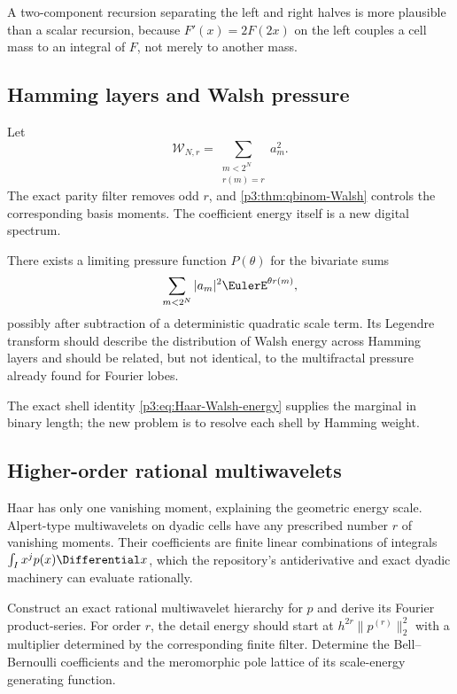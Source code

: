 \documentclass[11pt]{article}
\theoremstyle{definition}
\theoremstyle{remark}
\begin{document}
A two-component recursion separating the left and right halves is more
plausible than a scalar recursion, because $F'(x)=2F(2x)$ on the left couples a
cell mass to an integral of $F$, not merely to another mass.

\subsection{Hamming layers and Walsh pressure}

Let
\begin{equation}\label{p3:eq:Walsh-layer-energy}
 \mathcal W_{N,r}=\sum_{\substack{m<2^N\\r(m)=r}}a_m^2.
\end{equation}
The exact parity filter removes odd $r$, and
\cref{p3:thm:qbinom-Walsh} controls the corresponding basis moments.  The
coefficient energy itself is a new digital spectrum.

\begin{conjecture}
\label{p3:conj:Walsh-pressure}
There exists a limiting pressure function $P(\theta)$ for the bivariate sums
\begin{equation}\label{p3:eq:Walsh-pressure-sum}
 \sum_{m<2^N}|a_m|^2\EulerE^{\theta r(m)},
\end{equation}
possibly after subtraction of a deterministic quadratic scale term.  Its
Legendre transform should describe the distribution of Walsh energy across
Hamming layers and should be related, but not identical, to the multifractal
pressure already found for Fourier lobes.
\end{conjecture}

The exact shell identity \eqref{p3:eq:Haar-Walsh-energy} supplies the marginal in
binary length; the new problem is to resolve each shell by Hamming weight.

\subsection{Higher-order rational multiwavelets}

Haar has only one vanishing moment, explaining the geometric energy scale.
Alpert-type multiwavelets on dyadic cells have any prescribed number $r$ of
vanishing moments.  Their coefficients are finite linear combinations of
integrals $\int_Ix^jp(x)\Differential x$, which the repository's antiderivative and exact
dyadic machinery can evaluate rationally.

\begin{openproblem}
\label{p3:op:Alpert}
Construct an exact rational multiwavelet hierarchy for $p$ and derive its
Fourier product-series.  For order $r$, the detail energy should start at
$h^{2r}\|p^{(r)}\|_2^2$ with a multiplier determined by the corresponding
finite filter.  Determine the Bell--Bernoulli coefficients and the meromorphic
pole lattice of its scale-energy generating function.
\end{openproblem}
\end{document}
